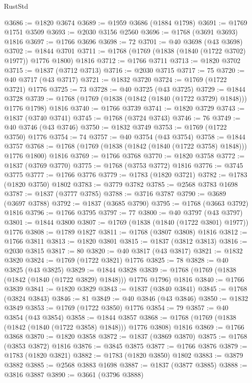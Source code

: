 \begin{lexlean}{RustStd}
\begin{coremodule}
{\begin{coremodule}
{{{{{{{{{{{{{{{{{{{{{{{{{{{{{{{{{{{{{{{{{{{{{{{@3686 := @1820 @3674
@3689 := @1959 @3686 (@1884 @1798)
@3691 := @1769 @1751 @3509
@3693 := @2030 @3156 @2560
@3696 := @1768 (@3691 @3693) @1816
@3697 := @1766 @3696
@3698 := 72
@3701 := @40 @3698 (@43 @3698)
@3702 := @1844 @3701
@3711 := @1768 (@1769 (@1838 (@1840 (@1722 @3702) @1977)) @1776 @1800) @1816
@3712 := @1766 @3711
@3713 := @1820 @3702
@3715 := @1837 (@3712 @3713)
@3716 := @2030 @3715
@3717 := 75
@3720 := @40 @3717 (@43 @3717)
@3721 := @1832 @3720
@3724 := @1769 (@1722 @3721) @1776
@3725 := 73
@3728 := @40 @3725 (@43 @3725)
@3729 := @1844 @3728
@3739 := @1768 (@1769 (@1838 (@1842 (@1840 (@1722 @3729) @1848))) @1776 @1798) @1816
@3740 := @1766 @3739
@3741 := @1820 @3729
@3743 := @1837 (@3740 @3741)
@3745 := @1768 (@3724 @3743)
@3746 := 76
@3749 := @40 @3746 (@43 @3746)
@3750 := @1832 @3749
@3753 := @1769 (@1722 @3750) @1776
@3754 := 74
@3757 := @40 @3754 (@43 @3754)
@3758 := @1844 @3757
@3768 := @1768 (@1769 (@1838 (@1842 (@1840 (@1722 @3758) @1848))) @1776 @1800) @1816
@3769 := @1766 @3768
@3770 := @1820 @3758
@3772 := @1837 (@3769 @3770)
@3775 := @1768 (@3753 @3772) @1816
@3776 := @3745 @3775
@3777 := @1766 @3776
@3779 := @1783 (@1820 @3721)
@3782 := @1783 (@1820 @3750) @1802
@3783 := @3779 @3782
@3785 := @2568 @3783 @1698
@3787 := @1837 (@3777 @3785)
@3788 := @3716 @3787
@3790 := @3689 (@3697 @3788)
@3792 := @1837 (@3685 @3790)
@3795 := @1768 (@3663 @3792) @1816
@3796 := @1766 @3795
@3797 := 77
@3800 := @40 @3797 (@43 @3797)
@3801 := @1844 @3800
@3807 := @1769 (@1838 (@1840 (@1722 @3801) @1977)) @1776
@3808 := @1789 @1827
@3811 := @1768 (@3807 @3808) @1816
@3812 := @1766 @3811
@3813 := @1820 @3801
@3815 := @1837 (@3812 @3813)
@3816 := @2030 @3815
@3817 := 80
@3820 := @40 @3817 (@43 @3817)
@3821 := @1832 @3820
@3824 := @1769 (@1722 @3821) @1776
@3825 := 78
@3828 := @40 @3825 (@43 @3825)
@3829 := @1844 @3828
@3839 := @1768 (@1769 (@1838 (@1842 (@1840 (@1722 @3829) @1848))) @1776 @1796) @1816
@3840 := @1766 @3839
@3841 := @1820 @3829
@3843 := @1837 (@3840 @3841)
@3845 := @1768 (@3824 @3843)
@3846 := 81
@3849 := @40 @3846 (@43 @3846)
@3850 := @1832 @3849
@3853 := @1769 (@1722 @3850) @1776
@3854 := 79
@3857 := @40 @3854 (@43 @3854)
@3858 := @1844 @3857
@3868 := @1768 (@1769 (@1838 (@1842 (@1840 (@1722 @3858) @1848))) @1776 @3808) @1816
@3869 := @1766 @3868
@3870 := @1820 @3858
@3872 := @1837 (@3869 @3870)
@3875 := @1768 (@3853 @3872) @1816
@3876 := @3845 @3875
@3877 := @1766 @3876
@3879 := @1783 (@1820 @3821)
@3882 := @1783 (@1820 @3850) @1802
@3883 := @3879 @3882
@3885 := @2568 @3883 @1698
@3887 := @1837 (@3877 @3885)
@3888 := @3816 @3887
@3890 := @3661 (@3796 @3888)
}}}}}}}}}}}}}}}}}}}}}}}}}}}}}}}}}}}}}}}}}}}}}}}
\end{coremodule}}
\end{coremodule}
\end{lexlean}
